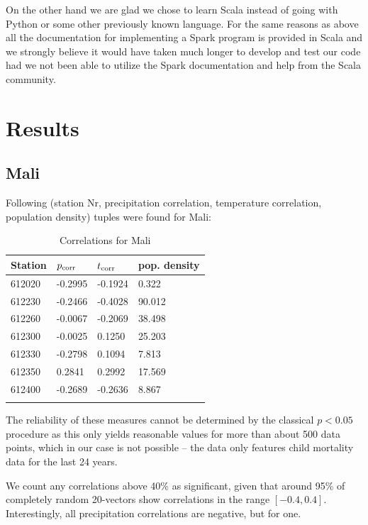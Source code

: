 \documentclass[
10pt, %
a4paper, %
oneside, %
headinclude,footinclude, %
useAMS,
usenatbib
]{template/mn2e}  %
\begin{document}
On the other hand we are glad we chose to learn Scala instead of going with Python or some other previously known language. For the same reasons as above all the documentation for implementing a Spark program is provided in Scala and we strongly believe it would have taken much longer to develop and test our code had we not been able to utilize the Spark documentation and help from the Scala community.

\section{Results}
\subsection{Mali}
Following (station Nr, precipitation correlation, temperature
correlation, population density) tuples were found for Mali:

\begin{table}
    \caption{Correlations for Mali}
    \begin{tabular}{ l l l l }
        \hline\hline
        Station & $p_{\rm corr}$ & $t_{\rm corr}$ & pop. density\\
        \hline
        612020 & -0.2995 & -0.1924 &  0.322\\
        612230 & -0.2466 & -0.4028 & 90.012\\
        612260 & -0.0067 & -0.2069 & 38.498\\
        612300 & -0.0025 &  0.1250 & 25.203\\
        612330 & -0.2798 &  0.1094 &  7.813\\
        612350 &  0.2841 &  0.2992 & 17.569\\
        612400 & -0.2689 & -0.2636 &  8.867\\
        \hline
        \label{tab:MI}
    \end{tabular}
\end{table}


The reliability of these measures cannot be determined by the classical $p<0.05$ procedure as this only yields reasonable values for more than about 500 data points, which in our case is not possible -- the data only features child mortality data for the last 24 years.

We count any correlations above 40\% as significant, given that around 95\% of completely random 20-vectors show correlations in the range $[-0.4, 0.4]$.
Interestingly, all precipitation correlations are negative, but for
one.
\end{document}
